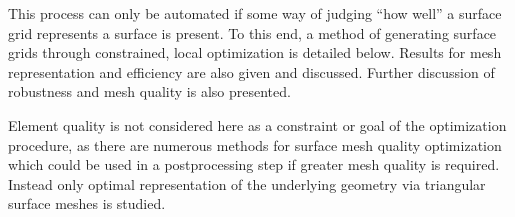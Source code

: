 This process can only be automated if some way of judging ``how well'' a
surface grid represents a surface is present. To this end, a method of
generating surface grids through constrained, local optimization is
detailed below. Results for mesh representation and efficiency are also
given and discussed.  Further discussion of robustness and mesh quality
is also presented.

Element quality is not considered here as a constraint or goal of the 
optimization procedure, as there
are numerous methods for surface mesh quality optimization
\cite{frey1998,garimella2002,garimella2004a,garimella2004b,jiao2005,jiao2006,jiao2011,jiao2013,lopez2008,montenegro2005,montenegro2006,montenegro2008,montenegro2011,roca2012,roca2013,shivanna2010,zhang2009}
which could be used in a postprocessing step if greater mesh quality is
required.  Instead only optimal representation of the underlying
geometry via triangular surface meshes is studied.

